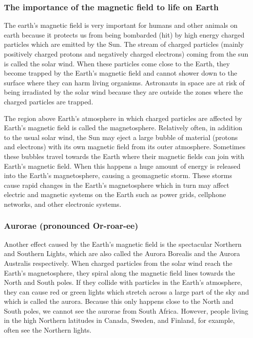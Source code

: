 \label{m37830*fs-id7505799}
            \subsubsection{ The importance of the magnetic field to life on Earth }
            \nopagebreak
            
\label{m37830*fs-id1166211137674}The earth's magnetic field is very important for humans and other animals on earth because it protects us from being bombarded (hit) by high energy charged particles which are emitted by the Sun. The stream of charged particles (mainly positively charged protons and negatively charged electrons) coming from the sun is called the solar wind. When these particles come close to the Earth, they become trapped by the Earth's magnetic field and cannot shower down to the surface where they can harm living organisms. 
Astronauts in space are at risk of being irradiated by the solar wind because they are outside the zones where the charged particles are trapped. 
\par  
\label{m37830*fs-id1166236522828}
The region above Earth's atmosphere in which charged particles are affected by Earth's magnetic field is called the magnetosphere. 
Relatively often, in addition to the usual solar wind, the Sun may eject a large bubble of material (protons and electrons) with its own magnetic field from its outer atmosphere. Sometimes these bubbles travel towards the Earth where their magnetic fields can join with Earth's magnetic field. When this happens a huge amount of energy is released into the Earth's magnetosphere, causing a geomagnetic storm. These storms cause rapid changes in the Earth's magnetosphere which in turn may affect electric and magnetic systems on the Earth such as power grids, cellphone networks, and other electronic systems.
\par 


\label{m37830*fs-id1166218597625}
            \subsubsection{ Aurorae (pronounced Or-roar-ee) }
            \nopagebreak
            
 
\label{m37830*fs-id1166211416999}
Another effect caused by the Earth's magnetic field is the spectacular Northern and Southern Lights, which are also called the Aurora Borealis and the Aurora Australis respectively. When charged particles from the solar wind reach the Earth's magnetosphere, they spiral along the magnetic field lines towards the North and South poles. If they collide with particles in the Earth's atmosphere, they can cause red or green lights which stretch across a large part of the sky and which is called the aurora. Because this only happens close to the North and South poles, we cannot see the aurorae from South Africa. However, people living in the high Northern latitudes in Canada, Sweden, and Finland, for example, often see the Northern lights.  
\par 



